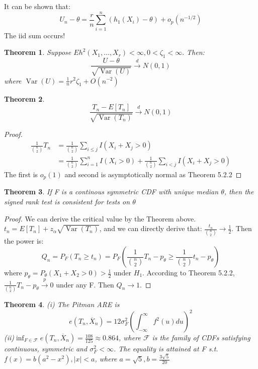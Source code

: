 \documentclass{ctexart}
\newtheorem{theorem}{Theorem}[subsection]
\begin{document}
It can be shown that: 
\[
U_{n}-\theta  =\frac{r}{n}\sum_{i=1}^{n} (h_{1}(X_{i})-\theta)+o_{p}(n^{-1/2})
\] 
The iid sum occurs! 
\begin{theorem}
  Suppose \(Eh^{2}(X_{1},\ldots,X_r)<\infty,0<\zeta_{1}<\infty.\) Then: 
  \[
  \frac{U-\theta}{\sqrt{\operatorname{Var}(U)}}\xrightarrow{d}N(0,1)
  \]  
  where \(\operatorname{Var}(U)=\frac{1}{n}r^{2}\zeta_{1}+O(n^{-2})\) 
\end{theorem}
\begin{theorem}
  \[
  \frac{T_{n}-E[T_{n}]}{\sqrt{\operatorname{Var}(T_{n})}}\xrightarrow{d}N(0,1)
  \] 
\end{theorem}
\begin{proof}
  \begin{align*}
    \frac{1}{{n\choose 2}}T_{n}&=\frac{1}{{n\choose 2}}\sum_{i\le j}^{} I(X_{i}+X_{j }>0)\\
    &=\frac{1}{{n\choose 2}}\sum_{i=1}^{n} I(X_{i}>0)+\frac{1}{{n\choose 2}}\sum_{i<j }^{} I(X_{i}+X_{j }>0)
  \end{align*}
  The first is \(o_{p}(1)\) and second is asymptotically normal as Theorem 5.2.2 

\end{proof}
\begin{theorem}
  If F is a continous symmetric CDF with unique median \(\theta\), then the signed rank test is consistent for tests on \(\theta\)  
\end{theorem}
\begin{proof}
  We can derive the critical value by the Theorem above. \(t_{n}=E[T_{n}]+z_{\alpha}\sqrt{\operatorname{Var}(T_{n})}\), and we can directly derive that: \(\frac{t_{n}}{{n \choose 2}}\to \frac{1}{2}\).  
  Then the power is: 
  \[
  Q_{n}=P_{F}(T_{n}\ge t_{n})=P_{F}\left(\frac{1}{{n \choose 2}}T_{n}-p_{\theta}\ge \frac{1}{{n \choose 2}}t_{n}-p_{\theta}  \right)
  \] 
  where \(p_{\theta}=P_{\theta}(X_{1}+X_{2}>0)>\frac{1}{2}\) under \(H_{1}\). According to Theorem 5.2.2, \(\frac{1}{{n \choose 2}}T_{n}-p_{\theta}\xrightarrow{p}0\) under any F. Then \(Q_{n}\to 1\).   
\end{proof}
\begin{theorem}
  (i) The Pitman ARE is 
  \[
  e(T_{n},\overline{X}_{n})=12\sigma_{F}^{2}\left( \int_{-\infty}^{\infty}f^{2}(u)du \right)^{2}
  \] 
  (ii)\(\inf_{F\in \mathcal{F} }e(T_{n},\overline{X}_{n})=\frac{108}{125}\approx 0.864\), where \(\mathcal{F}\) is the family of CDFs satisfying continuous, symmetric and \(\sigma^{2}_{F}<\infty\). The equality is attained at F s.t. \(f(x)=b(a^{2}-x^{2}),|x|<a\), where \(a=\sqrt{5},b=\frac{3\sqrt{5}}{20}\)     
\end{theorem}
\end{document}
